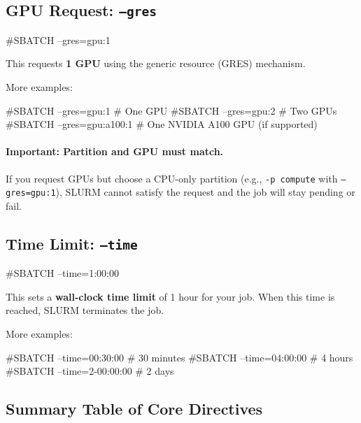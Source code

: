 \documentclass[11pt]{article}
\begin{document}
\subsection{GPU Request: \texttt{--gres}}

\begin{codeblock}
#SBATCH --gres=gpu:1
\end{codeblock}

This requests \textbf{1 GPU} using the generic resource (GRES) mechanism.

More examples:\\
\begin{codeblock}
#SBATCH --gres=gpu:1          # One GPU
#SBATCH --gres=gpu:2          # Two GPUs
#SBATCH --gres=gpu:a100:1     # One NVIDIA A100 GPU (if supported)
\end{codeblock}

\paragraph{Important: Partition and GPU must match.}

If you request GPUs but choose a CPU-only partition (e.g., \texttt{-p compute} with \texttt{--gres=gpu:1}), SLURM cannot satisfy the request and the job will stay pending or fail.

\subsection{Time Limit: \texttt{--time}}

\begin{codeblock}
#SBATCH --time=1:00:00
\end{codeblock}

This sets a \textbf{wall-clock time limit} of 1 hour for your job. When this time is reached, SLURM terminates the job.

More examples:\\
\begin{codeblock}
#SBATCH --time=00:30:00   # 30 minutes
#SBATCH --time=04:00:00   # 4 hours
#SBATCH --time=2-00:00:00 # 2 days
\end{codeblock}

\subsection{Summary Table of Core Directives}
\end{document}
